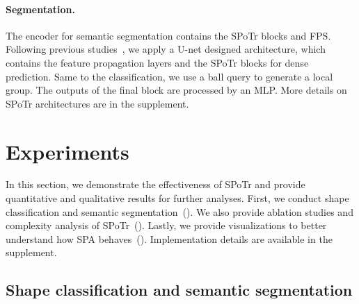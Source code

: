 \documentclass[10pt,twocolumn,letterpaper]{article}
\begin{document}
\paragraph{Segmentation.}
The encoder for semantic segmentation contains the SPoTr blocks and FPS.
Following previous studies~\cite{qi2017pointnet++}, we apply a U-net designed architecture, which contains the feature propagation layers and the SPoTr blocks for dense prediction.
Same to the classification, we use a ball query to generate a local group.
The outputs of the final block are processed by an MLP.
More details on SPoTr architectures are in the supplement.
 \section{Experiments}
    \label{sec:4}
In this section, we demonstrate the effectiveness of SPoTr and provide quantitative and qualitative results for further analyses.
First, we conduct shape classification and semantic segmentation~().
We also provide ablation studies and complexity analysis of SPoTr~().
Lastly, we provide visualizations to better understand how SPA behaves~(). Implementation details are available in the supplement.


%
     \subsection{Shape classification and semantic segmentation}
    \label{sec:4.1}
\end{document}
